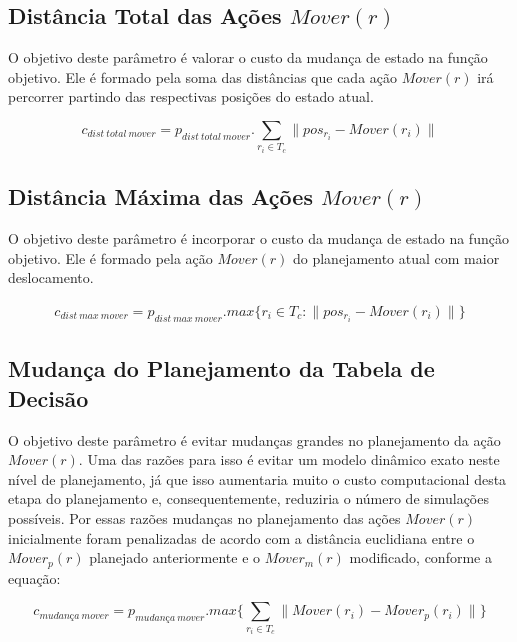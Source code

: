 \subsection{Distância Total das Ações $Mover(r)$}

O objetivo deste parâmetro é valorar o custo da mudança de estado na função
objetivo. Ele é formado pela soma das distâncias que cada ação $Mover(r)$ irá
percorrer partindo das respectivas posições do estado atual.

\begin{dmath}
 c_{dist{\ }total{\ }mover} = p_{dist{\ }total{\ }mover} .
 \sum_{r_i \in T_c} \lVert pos_{r_i} - Mover(r_i)\rVert
\end{dmath}

\subsection{Distância Máxima das Ações $Mover(r)$}

O objetivo deste parâmetro é incorporar o custo da mudança de estado na função
objetivo. Ele é formado pela ação $Mover(r)$ do planejamento atual com maior
deslocamento.

\begin{gather}
 c_{dist{\ }max{\ }mover}= p_{dist{\ }max{\ }mover} .
 max \lbrace r_i \in T_c : \lVert pos_{r_i} - Mover(r_i)\rVert \rbrace
\end{gather}

\subsection{Mudança do Planejamento da Tabela de Decisão}\label{subsec:change_cost}

O objetivo deste parâmetro é evitar mudanças grandes no planejamento da ação
$Mover(r)$. Uma das razões para isso é evitar um modelo dinâmico exato neste
nível de planejamento, já que isso aumentaria muito o custo computacional desta
etapa do planejamento e, consequentemente, reduziria o número de simulações
possíveis. Por essas razões mudanças no planejamento das ações $Mover(r)$
inicialmente foram penalizadas de acordo com a distância euclidiana entre o
$Mover_p(r)$ planejado anteriormente e o $Mover_{m}(r)$ modificado, conforme a
equação:

\begin{dmath}
 c_{mudança{\ }mover} = p_{mudança{\ }mover} .
 max \lbrace \sum_{r_i \in T_c} \lVert Mover(r_i) - Mover_p(r_i)\rVert \rbrace
\end{dmath}

